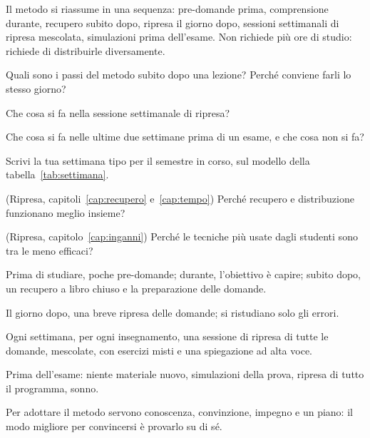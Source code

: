 \begin{daricordare}
Il metodo si riassume in una sequenza: pre-domande prima, comprensione
durante, recupero subito dopo, ripresa il giorno dopo, sessioni
settimanali di ripresa mescolata, simulazioni prima dell'esame. Non
richiede più ore di studio: richiede di distribuirle diversamente.
\end{daricordare}

\begin{domande}
  \item Quali sono i passi del metodo subito dopo una lezione? Perché
        conviene farli lo stesso giorno?
  \item Che cosa si fa nella sessione settimanale di ripresa?
  \item Che cosa si fa nelle ultime due settimane prima di un esame, e
        che cosa non si fa?
  \item Scrivi la tua settimana tipo per il semestre in corso, sul
        modello della tabella~\ref{tab:settimana}.
  \item (Ripresa, capitoli~\ref{cap:recupero} e~\ref{cap:tempo})
        Perché recupero e distribuzione funzionano meglio insieme?
  \item (Ripresa, capitolo~\ref{cap:inganni}) Perché le tecniche più
        usate dagli studenti sono tra le meno efficaci?
\end{domande}

\begin{sintesi}
  \item Prima di studiare, poche pre-domande; durante, l'obiettivo è
        capire; subito dopo, un recupero a libro chiuso e la
        preparazione delle domande.
  \item Il giorno dopo, una breve ripresa delle domande; si ristudiano
        solo gli errori.
  \item Ogni settimana, per ogni insegnamento, una sessione di ripresa
        di tutte le domande, mescolate, con esercizi misti e una
        spiegazione ad alta voce.
  \item Prima dell'esame: niente materiale nuovo, simulazioni della
        prova, ripresa di tutto il programma, sonno.
  \item Per adottare il metodo servono conoscenza, convinzione, impegno
        e un piano: il modo migliore per convincersi è provarlo su di
        sé.
\end{sintesi}

\finecapitolo

